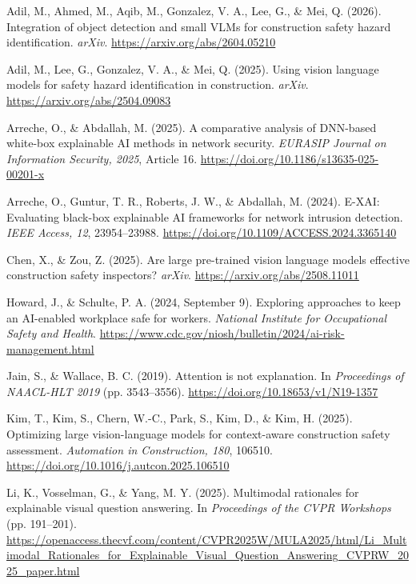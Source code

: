 \documentclass[12pt,letterpaper,twoside]{article}
\newenvironment{apareferences}
  {\begin{list}{}{%
    \setlength{\leftmargin}{0.5in}%
    \setlength{\itemindent}{-0.5in}%
    \setlength{\itemsep}{0pt}%
    \setlength{\parsep}{0pt}%
    \setlength{\topsep}{0pt}}}
  {\end{list}}
\begin{document}
\begin{apareferences}
\item Adil, M., Ahmed, M., Aqib, M., Gonzalez, V. A., Lee, G., \& Mei, Q. (2026). Integration of object detection and small VLMs for construction safety hazard identification. \textit{arXiv}. \url{https://arxiv.org/abs/2604.05210}

\item Adil, M., Lee, G., Gonzalez, V. A., \& Mei, Q. (2025). Using vision language models for safety hazard identification in construction. \textit{arXiv}. \url{https://arxiv.org/abs/2504.09083}

\item Arreche, O., \& Abdallah, M. (2025). A comparative analysis of DNN-based white-box explainable AI methods in network security. \textit{EURASIP Journal on Information Security, 2025}, Article 16. \url{https://doi.org/10.1186/s13635-025-00201-x}

\item Arreche, O., Guntur, T. R., Roberts, J. W., \& Abdallah, M. (2024). E-XAI: Evaluating black-box explainable AI frameworks for network intrusion detection. \textit{IEEE Access, 12}, 23954--23988. \url{https://doi.org/10.1109/ACCESS.2024.3365140}

\item Chen, X., \& Zou, Z. (2025). Are large pre-trained vision language models effective construction safety inspectors? \textit{arXiv}. \url{https://arxiv.org/abs/2508.11011}

\item Howard, J., \& Schulte, P. A. (2024, September 9). Exploring approaches to keep an AI-enabled workplace safe for workers. \textit{National Institute for Occupational Safety and Health}. \url{https://www.cdc.gov/niosh/bulletin/2024/ai-risk-management.html}

\item Jain, S., \& Wallace, B. C. (2019). Attention is not explanation. In \textit{Proceedings of NAACL-HLT 2019} (pp. 3543--3556). \url{https://doi.org/10.18653/v1/N19-1357}

\item Kim, T., Kim, S., Chern, W.-C., Park, S., Kim, D., \& Kim, H. (2025). Optimizing large vision-language models for context-aware construction safety assessment. \textit{Automation in Construction, 180}, 106510. \url{https://doi.org/10.1016/j.autcon.2025.106510}

\item Li, K., Vosselman, G., \& Yang, M. Y. (2025). Multimodal rationales for explainable visual question answering. In \textit{Proceedings of the CVPR Workshops} (pp. 191--201). \url{https://openaccess.thecvf.com/content/CVPR2025W/MULA2025/html/Li_Multimodal_Rationales_for_Explainable_Visual_Question_Answering_CVPRW_2025_paper.html}


\end{apareferences}
\end{document}
